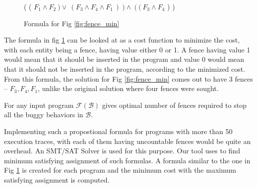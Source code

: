 \begin{figure}
\begin{center}
	( ( $F_1 \land F_2\ ) \lor\ ( F_3 \land F_4 \land F_1\ )\ ) \land\ (\ (\ F_3 \land F_4$ ) )
	\caption{Formula for Fig \ref{fig:fence_min}}
	\label{fig:fence_form}
\end{center}
\end{figure}

\par
The formula in fig \ref{fig:fence_form} can be looked at as a 
cost function to minimize the cost, with each entity being a fence, 
having value either 0 or 1. A fence having value 1 would mean that 
it should be inserted in the program and value 0 would mean that 
it should not be inserted in the program, according to the 
minimized cost. From this formula, the solution for Fig \ref{fig:fence_min} 
comes out to have 3 fences – \textit{$F_3, F_4, F_1$}, 
unlike the original solution where four fences were sought.

\begin{theorem}
	For any input program $ \mathcal{F}(\mathcal{B}) $ gives optimal
	number of fences required to stop all the buggy behaviors in 
	$ \mathcal{B} $.
\end{theorem}

\par
Implementing such a propostional formula for programs with 
more than 50 execution traces, with each of them having uncountable 
fences would be quite an overhead. An SMT/SAT Solver is used for 
this purpose. Our tool uses \z to find minimum satisfying assignment 
of such formulas. A formula similar to the one in Fig \ref{fig:fence_form} 
is created for each program and the minimum cost with the maximum 
satisfying assignment is computed. 




